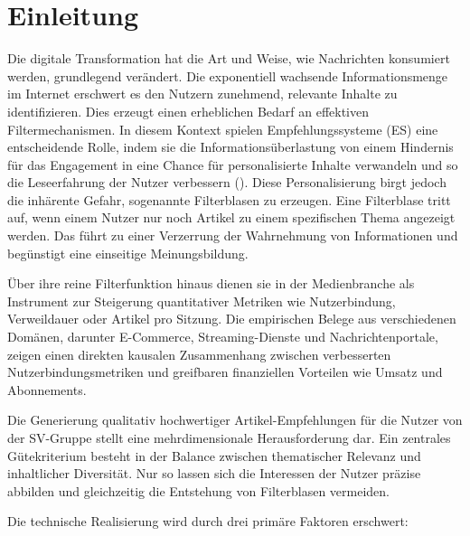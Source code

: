 \section{Einleitung}

Die digitale Transformation hat die Art und Weise, wie Nachrichten konsumiert werden, grundlegend verändert. 
Die exponentiell wachsende Informationsmenge im Internet erschwert es den Nutzern zunehmend,
relevante Inhalte zu identifizieren. Dies erzeugt einen erheblichen Bedarf an effektiven Filtermechanismen.
In diesem Kontext spielen Empfehlungssysteme (ES) eine entscheidende Rolle, 
indem sie die Informationsüberlastung von einem Hindernis für das Engagement in eine Chance für personalisierte 
Inhalte verwandeln und so die Leseerfahrung der Nutzer verbessern (\cite{wu_personalized_2022}).
Diese Personalisierung birgt jedoch die inhärente Gefahr, sogenannte Filterblasen zu erzeugen.
Eine Filterblase tritt auf, wenn einem Nutzer nur noch Artikel zu einem spezifischen Thema angezeigt werden. 
Das führt zu einer Verzerrung der Wahrnehmung von Informationen und begünstigt eine einseitige Meinungsbildung.  

Über ihre reine Filterfunktion hinaus dienen sie in der Medienbranche als Instrument zur Steigerung 
quantitativer Metriken wie Nutzerbindung, Verweildauer oder Artikel pro Sitzung.
Die empirischen Belege aus verschiedenen Domänen, darunter E-Commerce, Streaming-Dienste
und Nachrichtenportale, zeigen einen direkten kausalen Zusammenhang zwischen verbesserten
Nutzerbindungsmetriken und greifbaren finanziellen Vorteilen wie Umsatz und Abonnements.

Die Generierung qualitativ hochwertiger Artikel-Empfehlungen für die Nutzer von der SV-Gruppe stellt eine 
mehrdimensionale Herausforderung dar. 
Ein zentrales Gütekriterium besteht in der Balance zwischen thematischer Relevanz und inhaltlicher Diversität. 
Nur so lassen sich die Interessen der Nutzer präzise abbilden und gleichzeitig die Entstehung von Filterblasen vermeiden.

Die technische Realisierung wird durch drei primäre Faktoren erschwert:

